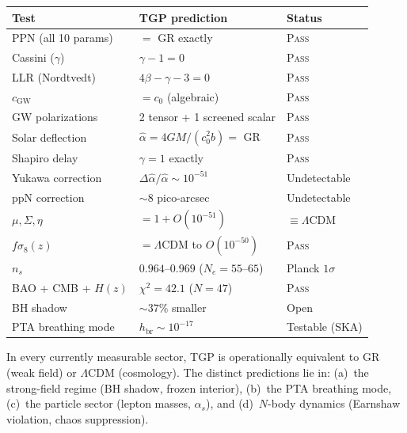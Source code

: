\begin{center}\small
\begin{tabular}{@{}lp{6cm}l@{}}
\toprule
\textbf{Test} & \textbf{TGP prediction} & \textbf{Status} \\
\midrule
PPN (all 10 params)  & $=$ GR exactly & \textsc{Pass} \\
Cassini ($\gamma$)   & $\gamma-1=0$ & \textsc{Pass} \\
LLR (Nordtvedt)      & $4\beta-\gamma-3=0$ & \textsc{Pass} \\
$c_{\mathrm{GW}}$    & $=c_{0}$ (algebraic) & \textsc{Pass} \\
GW polarizations     & 2 tensor + 1 screened scalar & \textsc{Pass} \\
Solar deflection     & $\hat\alpha=4GM/(c_{0}^{2}b)=$ GR & \textsc{Pass} \\
Shapiro delay        & $\gamma=1$ exactly & \textsc{Pass} \\
Yukawa correction    & $\Delta\hat\alpha/\hat\alpha\sim 10^{-51}$ & Undetectable \\
ppN correction       & $\sim 8$ pico-arcsec & Undetectable \\
$\mu,\Sigma,\eta$    & $=1+O(10^{-51})$ & $\equiv\Lambda$CDM \\
$f\sigma_{8}(z)$     & $=\Lambda$CDM to $O(10^{-50})$ & \textsc{Pass} \\
$n_{s}$              & $0.964$--$0.969$ ($N_{e}=55$--$65$) & Planck $1\sigma$ \\
BAO + CMB + $H(z)$   & $\chi^{2}=42.1$ ($N=47$) & \textsc{Pass} \\
BH shadow            & $\sim 37\%$ smaller & Open \\
PTA breathing mode   & $h_{\mathrm{br}}\sim 10^{-17}$ & Testable (SKA) \\
\bottomrule
\end{tabular}
\end{center}

\noindent
In every currently measurable sector, TGP is operationally
equivalent to GR (weak field) or $\Lambda$CDM (cosmology).
The distinct predictions lie in: (a)~the strong-field regime
(BH shadow, frozen interior), (b)~the PTA breathing mode,
(c)~the particle sector (lepton masses, $\alpha_{s}$), and
(d)~$N$-body dynamics (Earnshaw violation, chaos suppression).
